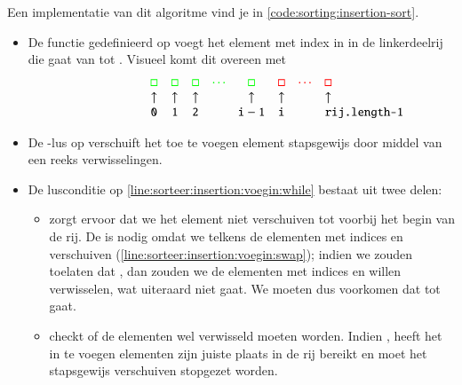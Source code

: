 Een implementatie van dit algoritme vind je in \cref{code:sorting:insertion-sort}.
\begin{itemize}
  \item De functie  gedefinieerd op
        voegt het element met index  in in de linkerdeelrij die
        gaat van  tot . Visueel komt dit overeen met
        {
          \newcommand{\IN}[1]{{\color{red}#1}}
          \newcommand{\OUT}[1]{{\color{green}#1}}
          \[
            \begin{array}{cccccccc}
              \OUT\square & \OUT\square & \OUT\square & \OUT\cdots & \OUT\square &
                \IN\square & \IN\cdots &  \IN\square \\
              \uparrow & \uparrow & \uparrow && \uparrow & \uparrow && \uparrow\\
              {\tt 0} & {\tt 1} & {\tt 2} && {\tt i-1} & {\tt i} && \makebox[5pt][l]{\tt rij.length-1} \\
            \end{array}
          \]
        }
  \item De -lus op
        verschuift het toe te voegen element stapsgewijs door middel van een reeks verwisselingen.
  \item De lusconditie op \cref{line:sorteer:insertion:voegin:while} bestaat uit twee delen:
        \begin{itemize}
          \item {} zorgt ervoor dat we het element niet verschuiven tot
                voorbij het begin van de rij. De  is nodig omdat
                we telkens de elementen met indices  en  verschuiven
                (\cref{line:sorteer:insertion:voegin:swap});
                indien we zouden toelaten dat , dan zouden
                we de elementen met indices  en  willen verwisselen,
                wat uiteraard niet gaat. We moeten dus voorkomen dat  tot  gaat.
          \item {} checkt of de elementen wel verwisseld moeten worden.
                Indien , heeft het in te voegen elementen
                zijn juiste plaats in de rij bereikt en moet het stapsgewijs verschuiven stopgezet worden.

\end{itemize}
\end{itemize}
